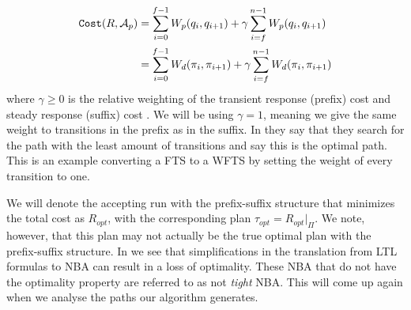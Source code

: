 \begin{align*}
\texttt{Cost} (R, \mathcal{A}_p) &= \sum_{i=0}^{f-1} W_p(q_i,q_{i+1}) + \gamma \sum_{i=f}^{n-1} W_p(q_i,q_{i+1}) \\
&= \sum_{i=0}^{f-1} W_d(\pi_i,\pi_{i+1}) + \gamma \sum_{i=f}^{n-1} W_d(\pi_i, \pi_{i+1})
\end{align*}
where $\gamma \geq 0$ is the relative weighting of the transient response (prefix) cost and steady response (suffix) cost \cite{guo15}. We will be using $\gamma = 1$, meaning we give the same weight to transitions in the prefix as in the suffix. In \cite{fainekos09} they say that they search for the path with the least amount of transitions and say this is the optimal path. This is an example converting a FTS to a WFTS by setting the weight of every transition to one.
 


We will denote the accepting run with the prefix-suffix structure that minimizes the total cost as $R_{opt}$, with the corresponding plan $\tau_{opt} = R_{opt}|_\Pi$. We note, however, that this plan may not actually be the true optimal plan with the prefix-suffix structure. In \cite{schuppan05} we see that simplifications in the translation from LTL formulas to NBA can result in a loss of optimality. These NBA that do not have the optimality property are referred to as not \textit{tight} NBA. This will come up again when we analyse the paths our algorithm generates. 